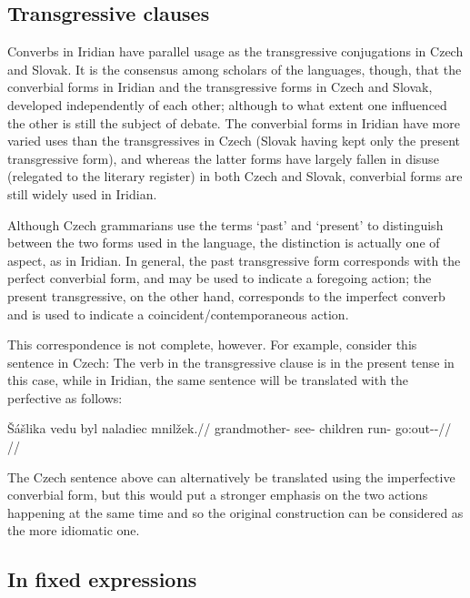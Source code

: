 \subsection{Transgressive clauses}

Converbs in Iridian have parallel usage as the transgressive conjugations in Czech and Slovak. It is the consensus among scholars of the languages, though, that the converbial forms in Iridian and the transgressive forms in Czech and Slovak, developed independently of each other; although to what extent one influenced the other is still the subject of debate. The converbial forms in Iridian have more varied uses than the transgressives in Czech (Slovak having kept only the present transgressive form), and whereas the latter forms have largely fallen in disuse (relegated to the literary register) in both Czech and Slovak, converbial forms are still widely used in Iridian.

Although Czech grammarians use the terms `past' and `present' to distinguish between the two forms used in the language, the distinction is actually one of aspect, as in Iridian. In general, the past transgressive form corresponds with the perfect converbial form, and may be used to indicate a foregoing action; the present transgressive, on the other hand, corresponds to the imperfect converb and is used to indicate a coincident/contemporaneous action.

This correspondence is not complete, however. For example, consider this sentence in Czech:  The verb in the transgressive clause is in the present tense in this case, while in Iridian, the same sentence will be translated with the perfective as follows:

\pex
\begingl
\gla \v{S}ášlika vedu byl naladiec mnilžek.//
\glb grandmother- see- children run- go:out-\Av{}-\Pf{}//
\glft {}//
\endgl
\xe

The Czech sentence above can alternatively be translated using the imperfective converbial form, but this would put a stronger emphasis on the two actions happening at the same time and so the original construction can be considered as the more idiomatic one.

\subsection{In fixed expressions}

